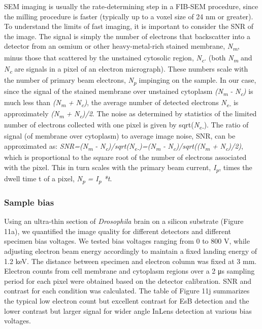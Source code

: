 \documentclass{article}
\begin{document}
SEM imaging is usually the rate-determining step in a FIB-SEM procedure, since the milling procedure is faster (typically up to a voxel size of 24 nm or greater). To understand the limits of fast imaging, it is important to consider the SNR of the image. The signal is simply the number of electrons that backscatter into a detector from an osmium or other heavy-metal-rich stained membrane, \emph{N\textsubscript{m}}, minus those that scattered by the unstained cytosolic region, \emph{N\textsubscript{c}}. (both \emph{N\textsubscript{m}} and \emph{N\textsubscript{c}} are signals in a pixel of an electron micrograph). These numbers scale with the number of primary beam electrons, \emph{N\textsubscript{p}} impinging on the sample. In our case, since the signal of the stained membrane over unstained cytoplasm \emph{(}\emph{N\textsubscript{m}} \emph{- }\emph{N\textsubscript{c}}\emph{)} is much less than \emph{(}\emph{N\textsubscript{m}} \emph{+ }\emph{N\textsubscript{c}}\emph{)}, the average number of detected electrons \emph{N\textsubscript{e-}} is approximately \emph{(}\emph{N\textsubscript{m}} \emph{+ }\emph{N\textsubscript{c}}\emph{)/2}. The noise as determined by statistics of the limited number of electrons collected with one pixel is given by sqrt(\emph{N\textsubscript{e-}}). The ratio of signal (of membrane over cytoplasm) to average image noise, SNR, can be approximated as: \emph{SNR=(}\emph{N\textsubscript{m}} \emph{- }\emph{N\textsubscript{c}}\emph{)/sqrt(}\emph{N\textsubscript{e-}}\emph{)=(}\emph{N\textsubscript{m}} \emph{- }\emph{N\textsubscript{c}}\emph{)/sqrt((}\emph{N\textsubscript{m}} \emph{+ }\emph{N\textsubscript{c}}\emph{)/2)}, which is proportional to the square root of the number of electrons associated with the pixel. This in turn scales with the primary beam current, \emph{I\textsubscript{p}}, times the dwell time t of a pixel, \emph{N\textsubscript{p}} \emph{= I\textsubscript{p} *t}.

\subsubsection*{Sample bias}

Using an ultra-thin section of \emph{Drosophila} brain on a silicon substrate (Figure 11a), we quantified the image quality for different detectors and different specimen bias voltages. We tested bias voltages ranging from 0 to 800 V, while adjusting electron beam energy accordingly to maintain a fixed landing energy of 1.2 keV. The distance between specimen and electron column was fixed at 3 mm. Electron counts from cell membrane and cytoplasm regions over a 2 μs sampling period for each pixel were obtained based on the detector calibration. SNR and contrast for each condition was calculated. The table of Figure 11j summarizes the typical low electron count but excellent contrast for EsB detection and the lower contrast but larger signal for wider angle InLens detection at various bias voltages.
\end{document}
